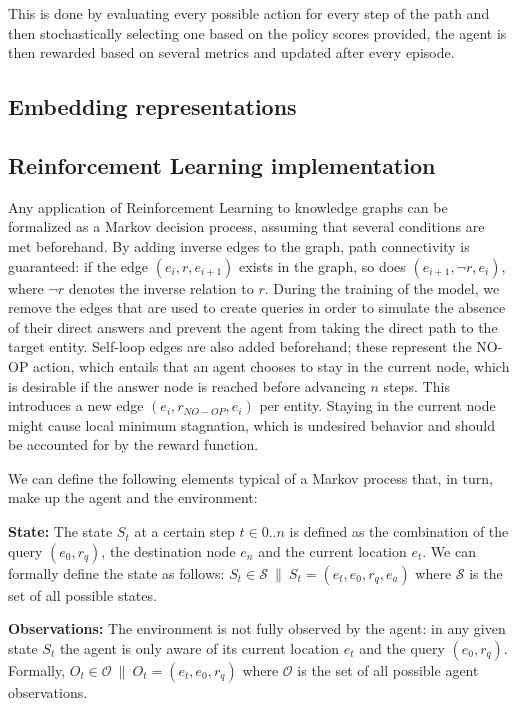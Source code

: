 This is done by evaluating every possible action for every step of the path and then stochastically selecting one based on the policy scores provided, the agent is then rewarded based on several metrics and updated after every episode.

\subsection{Embedding representations}\label{sec:spacerl-embeddings}

\subsection{Reinforcement Learning implementation}\label{sec:spacerl-rlimplementation}

Any application of Reinforcement Learning to knowledge graphs can be formalized as a Markov decision process, assuming that several conditions are met beforehand. By adding inverse edges to the graph, path connectivity is guaranteed: if the edge $(e_i,r,e_{i+1})$ exists in the graph, so does $(e_{i+1},\neg r,e_i)$, where $\neg r$ denotes the inverse relation to $r$. During the training of the model, we remove the edges that are used to create queries in order to simulate the absence of their direct answers and prevent the agent from taking the direct path to the target entity. Self-loop edges are also added beforehand; these represent the NO-OP action, which entails that an agent chooses to stay in the current node, which is desirable if the answer node is reached before advancing $n$ steps. This introduces a new edge $(e_i,r_{NO-OP},e_i)$ per entity. Staying in the current node might cause local minimum stagnation, which is undesired behavior and should be accounted for by the reward function.

We can define the following elements typical of a Markov process that, in turn, make up the agent and the environment:

\textbf{State:} The state $S_t$ at a certain step $t \in 0..n$ is defined as the combination of the query $(e_0, r_q)$, the destination node $e_n$ and the current location $e_t$. We can formally define the state as follows: $S_t \in \mathcal{S} ~\|~ S_t = (e_t, e_0, r_q, e_a)$ where $\mathcal{S}$ is the set of all possible states.

\textbf{Observations:} The environment is not fully observed by the agent: in any given state $S_t$ the agent is only aware of its current location $e_t$ and the query $(e_0,r_q)$. Formally, $O_t \in \mathcal{O} ~\|~ O_t = (e_t, e_0, r_q)$ where $\mathcal{O}$ is the set of all possible agent observations.

